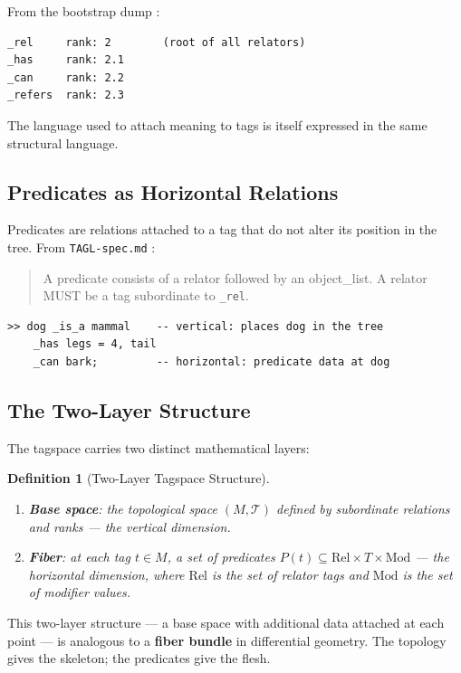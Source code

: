 \documentclass{article}
\newtheorem{definition}{Definition}[section]
\begin{document}
From the bootstrap dump \cite{bootstrap}:
\begin{verbatim}
_rel     rank: 2        (root of all relators)
_has     rank: 2.1
_can     rank: 2.2
_refers  rank: 2.3
\end{verbatim}

The language used to attach meaning to tags is itself expressed in the same
structural language.

\subsection{Predicates as Horizontal Relations}

Predicates are relations attached to a tag that do not alter its position in
the tree. From \texttt{TAGL-spec.md} \cite{spec}:
\begin{quote}
A predicate consists of a relator followed by an object\_list. A relator MUST
be a tag subordinate to \texttt{\_rel}.
\end{quote}

\begin{lstlisting}[style=tagl, caption={Vertical identity and horizontal predicates}]
>> dog _is_a mammal    -- vertical: places dog in the tree
    _has legs = 4, tail
    _can bark;         -- horizontal: predicate data at dog
\end{lstlisting}

\subsection{The Two-Layer Structure}

The tagspace carries two distinct mathematical layers:

\begin{definition}[Two-Layer Tagspace Structure]
\begin{enumerate}
  \item \textbf{Base space}: the topological space $(M, \mathcal{T})$ defined
        by subordinate relations and ranks --- the vertical dimension.
  \item \textbf{Fiber}: at each tag $t \in M$, a set of predicates
        $P(t) \subseteq \mathrm{Rel} \times T \times \mathrm{Mod}$ --- the
        horizontal dimension, where $\mathrm{Rel}$ is the set of relator tags
        and $\mathrm{Mod}$ is the set of modifier values.
\end{enumerate}
\end{definition}

This two-layer structure --- a base space with additional data attached at each
point --- is analogous to a \textbf{fiber bundle} in differential geometry. The
topology gives the skeleton; the predicates give the flesh.
\end{document}
